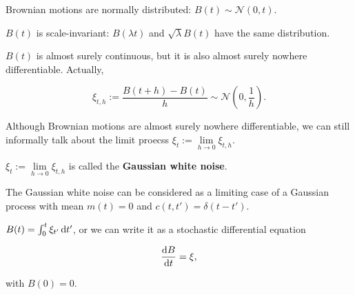 \begin{proposition}
    Brownian motions are normally distributed: $B(t) \sim \mathcal{N}(0, t)$.
\end{proposition}

\begin{proposition}
    $B(t)$ is scale-invariant: $B(\lambda t)$ and $\sqrt{\lambda} B(t)$ have the same distribution. 
\end{proposition}

\begin{proposition}
    $B(t)$ is almost surely continuous, but it is also almost surely nowhere differentiable. Actually, 

    \begin{equation*}
        \xi_{t, h} := \frac{B(t+h) - B(t)}{h} \sim \mathcal{N}\left(0, \frac{1}{h}\right).
    \end{equation*}
\end{proposition}

Although Brownian motions are almost surely nowhere differentiable, we can still informally talk about the limit proecss $\xi_t := \lim\limits_{h \to 0} \xi_{t, h}$. 

\begin{definition}
    $\xi_t := \lim\limits_{h \to 0} \xi_{t, h}$ is called the \textbf{Gaussian white noise}.
\end{definition}

\begin{remark}
    The Gaussian white noise can be considered as a limiting case of a Gaussian process with mean $m(t) = 0$ and $c(t, t') = \delta(t - t')$.
\end{remark}

\begin{proposition}
    $B(t) = \int_0^t \xi_{t'} \dif t'$, or we can write it as a stochastic differential equation 

    \begin{equation*}
        \frac{\dif B}{\dif t} = \xi, 
    \end{equation*}

    with $B(0) = 0$.
\end{proposition}